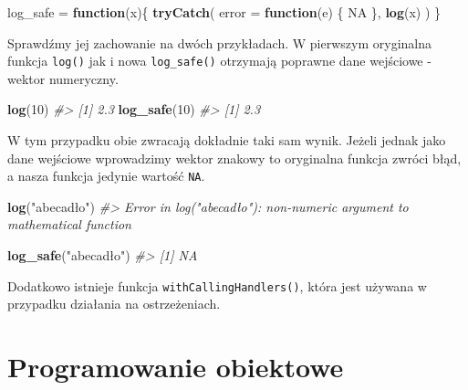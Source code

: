 \documentclass[paper=6in:9in,pagesize=pdftex,headinclude=on,footinclude=on,10pt]{scrbook}
\makeatletter
\newenvironment{Shaded}{\begin{snugshade}}{\end{snugshade}}
\newcommand{\CommentTok}[1]{\textcolor[rgb]{0.56,0.35,0.01}{\textit{#1}}}
\newcommand{\ControlFlowTok}[1]{\textcolor[rgb]{0.13,0.29,0.53}{\textbf{#1}}}
\newcommand{\DataTypeTok}[1]{\textcolor[rgb]{0.13,0.29,0.53}{#1}}
\newcommand{\DecValTok}[1]{\textcolor[rgb]{0.00,0.00,0.81}{#1}}
\newcommand{\KeywordTok}[1]{\textcolor[rgb]{0.13,0.29,0.53}{\textbf{#1}}}
\newcommand{\NormalTok}[1]{#1}
\newcommand{\OtherTok}[1]{\textcolor[rgb]{0.56,0.35,0.01}{#1}}
\newcommand{\StringTok}[1]{\textcolor[rgb]{0.31,0.60,0.02}{#1}}
\newenvironment{kframe}{%
\medskip{}
\setlength{\fboxsep}{.8em}
 \def\at@end@of@kframe{}%
 \ifinner\ifhmode%
  \def\at@end@of@kframe{\end{minipage}}%
  \begin{minipage}{\columnwidth}%
 \fi\fi%
 \def\FrameCommand##1{\hskip\@totalleftmargin \hskip-\fboxsep
 \colorbox{shadecolor}{##1}\hskip-\fboxsep
     \hskip-\linewidth \hskip-\@totalleftmargin \hskip\columnwidth}%
 \MakeFramed {\advance\hsize-\width
   \@totalleftmargin\z@ \linewidth\hsize
   \@setminipage}}%
 {\par\unskip\endMakeFramed%
 \at@end@of@kframe}
\newenvironment{rmdblock}[1]
  {
  \begin{itemize}
  \renewcommand{\labelitemi}{
    \raisebox{-.7\height}[0pt][0pt]{
      {\setkeys{Gin}{width=3em,keepaspectratio}\texttt{[image: images/\#1]}}
    }
  }
  \setlength{\fboxsep}{1em}
  \begin{kframe}
  \item
  }
  {
  \end{kframe}
  \end{itemize}
  }
\newenvironment{rmdinfo}
  {\begin{rmdblock}{compass}}
  {\end{rmdblock}}
\makeatother
\begin{document}
\begin{Shaded}
\begin{Highlighting}[]
\NormalTok{log_safe =}\StringTok{ }\ControlFlowTok{function}\NormalTok{(x)\{}
  \KeywordTok{tryCatch}\NormalTok{(}
  \DataTypeTok{error =} \ControlFlowTok{function}\NormalTok{(e) \{}
    \OtherTok{NA}
\NormalTok{  \},}
  \KeywordTok{log}\NormalTok{(x)}
\NormalTok{  )}
\NormalTok{\}}
\end{Highlighting}
\end{Shaded}

Sprawdźmy jej zachowanie na dwóch przykładach.
W pierwszym oryginalna funkcja \texttt{log()} jak i nowa \texttt{log\_safe()} otrzymają poprawne dane wejściowe - wektor numeryczny.

\begin{Shaded}
\begin{Highlighting}[]
\KeywordTok{log}\NormalTok{(}\DecValTok{10}\NormalTok{)}
\CommentTok{#> [1] 2.3}
\KeywordTok{log_safe}\NormalTok{(}\DecValTok{10}\NormalTok{)}
\CommentTok{#> [1] 2.3}
\end{Highlighting}
\end{Shaded}

W tym przypadku obie zwracają dokładnie taki sam wynik.
Jeżeli jednak jako dane wejściowe wprowadzimy wektor znakowy to oryginalna funkcja zwróci błąd, a nasza funkcja jedynie wartość \texttt{NA}.

\begin{Shaded}
\begin{Highlighting}[]
\KeywordTok{log}\NormalTok{(}\StringTok{"abecadło"}\NormalTok{)}
\CommentTok{#> Error in log("abecadło"): non-numeric argument to mathematical function}
\end{Highlighting}
\end{Shaded}

\begin{Shaded}
\begin{Highlighting}[]
\KeywordTok{log_safe}\NormalTok{(}\StringTok{"abecadło"}\NormalTok{)}
\CommentTok{#> [1] NA}
\end{Highlighting}
\end{Shaded}

\begin{rmdinfo}
Dodatkowo istnieje funkcja \texttt{withCallingHandlers()}, która jest używana w przypadku działania na ostrzeżeniach.
\end{rmdinfo}

\hypertarget{oop}{%
\section{Programowanie obiektowe}\label{oop}}
\end{document}
